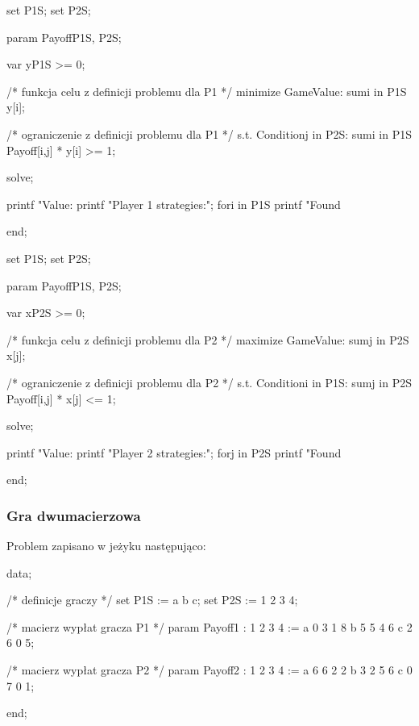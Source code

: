 \documentclass[polish]{standalone}
\begin{document}
\begin{code}[caption=Rozwiązanie dla gracza pierwszego]
set P1S;
set P2S;

param Payoff{P1S, P2S};

var y{P1S} >= 0;

/* funkcja celu z definicji problemu dla P1 */
minimize GameValue: sum{i in P1S} y[i];

/* ograniczenie z definicji problemu dla P1 */
s.t. Condition{j in P2S}:
    sum{i in P1S} Payoff[i,j] * y[i] >= 1;

solve;

printf "Value: %
printf "Player 1 strategies:\n";
for{i in P1S}
    printf "Found %

end;
\end{code}

\begin{code}[caption=Rozwiązanie dla gracza drugiego]
set P1S;
set P2S;

param Payoff{P1S, P2S};

var x{P2S} >= 0;

/* funkcja celu z definicji problemu dla P2 */
maximize GameValue: sum{j in P2S} x[j];

/* ograniczenie z definicji problemu dla P2 */
s.t. Condition{i in P1S}:
    sum{j in P2S} Payoff[i,j] * x[j] <= 1;

solve;

printf "Value: %
printf "Player 2 strategies:\n";
for{j in P2S}
    printf "Found %
 
end;
\end{code}

\subsubsection{Gra dwumacierzowa}

Problem zapisano w jeżyku  następująco:

\begin{code}[caption=Przykładowe dane]
data;

/* definicje graczy */
set P1S := a b c;
set P2S := 1 2 3 4;

/* macierz wypłat gracza P1 */
param Payoff1
    :  1  2  3  4 :=
    a  0  3  1  8
    b  5  5  4  6
    c  2  6  0  5;

/* macierz wypłat gracza P2 */
param Payoff2
    :  1  2  3  4 :=
    a  6  6  2  2
    b  3  2  5  6
    c  0  7  0  1;
 
end;
\end{code}
\end{document}
